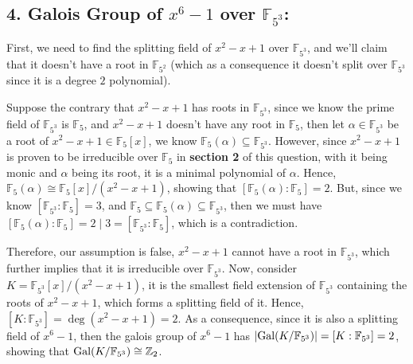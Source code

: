 \documentclass{article}
\newcommand{\FF}{\mathbb{F}}
\newcommand{\ZZ}{\mathbb{Z}}
\newcommand{\Gal}{\textmd{Gal}}
\begin{document}
\subsection*{4. Galois Group of $x^6-1$ over $\FF_{5^3}$:}
First, we need to find the splitting field of $x^2-x+1$ over $\FF_{5^3}$, and we'll claim that it doesn't have a root in $\FF_{5^2}$ (which as a consequence it doesn't split over $\FF_{5^3}$ since it is a degree $2$ polynomial).

Suppose the contrary that $x^2-x+1$ has roots in $\FF_{5^3}$, since we know the prime field of $\FF_{5^3}$ is $\FF_5$, and $x^2-x+1$ doesn't have any root in $\FF_5$, then let $\alpha\in \FF_{5^3}$ be a root of $x^2-x+1\in \FF_5[x]$, we know $\FF_5(\alpha)\subseteq \FF_{5^3}$.
However, since $x^2-x+1$ is proven to be irreducible over $\FF_5$ in \textbf{section 2} of this question, with it being monic and $\alpha$ being its root, it is a minimal polynomial of $\alpha$. Hence, $\FF_5(\alpha)\cong \FF_5[x]/(x^2-x+1)$, showing that $[\FF_5(\alpha):\FF_5]=2$. But, since we know $[\FF_{5^3}:\FF_5]=3$, and $\FF_5\subseteq \FF_5(\alpha)\subseteq \FF_{5^3}$, then we must have $[\FF_5(\alpha):\FF_5]=2\mid 3=[\FF_{5^3}:\FF_5]$, which is a contradiction.

Therefore, our assumption is false, $x^2-x+1$ cannot have a root in $\FF_{5^3}$, which further implies that it is irreducible over $\FF_{5^3}$.
Now, consider $K=\FF_{5^3}[x]/(x^2-x+1)$, it is the smallest field extension of $\FF_{5^3}$ containing the roots of $x^2-x+1$, which forms a splitting field of it. Hence, $[K:\FF_{5^3}] =\deg(x^2-x+1)= 2$. As a consequence, since it is also a splitting field of $x^6-1$, then the galois group of $x^6-1$ has $|\Gal(K/\FF_{5^3})| = [K:\FF_{5^3}] = 2$, showing that $\Gal(K/\FF_{5^3}) \cong \ZZ_2$.
\end{document}
